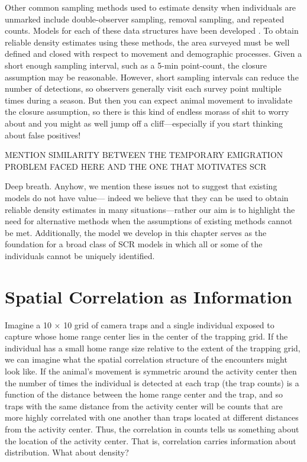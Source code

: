 Other common sampling methods used to estimate density when individuals are
unmarked include double-observer sampling, removal sampling, and
repeated counts. Models for each of these data structures have been
developed
\citep{nichols_etal:2000,farnsworth_etal:2002,royle:2004,royle:2004abc}. To
obtain reliable density estimates using these
methods, the area surveyed must be well defined and closed with
respect to movement and demographic processes. Given a short enough
sampling interval, such as a 5-min point-count, the closure
assumption may be reasonable. However, short sampling intervals can
reduce the number of detections, so observers generally visit each survey
point multiple times during a season. But then you can expect animal
movement to invalidate the closure assumption, so there is this kind
of endless morass of shit to worry about and you might as well jump
off a cliff---especially if you start thinking about false positives!

MENTION SIMILARITY BETWEEN THE TEMPORARY EMIGRATION PROBLEM FACED HERE
AND THE ONE THAT MOTIVATES SCR

Deep breath. Anyhow, we mention these issues not to suggest that
existing models do not have value---
indeed we believe that they can be used to obtain reliable density
estimates in many situations---rather our aim is to highlight the need for
alternative methods when the assumptions of existing methods cannot be
met. Additionally, the model we develop in this chapter serves as the
foundation for a broad class of SCR models in which all or some of the
individuals cannot be uniquely identified.



\section{Spatial Correlation as Information}


Imagine a 10 $\times$ 10 grid of camera traps and a single individual
exposed to capture whose home range center lies in the center of the
trapping grid. If the individual has a small home range size relative
to the extent of the trapping grid, we can imagine what the
spatial correlation structure of the encounters might look
like. If the animal's movement is symmetric around the activity center
then the number of times the individual is detected at each
trap (the trap counts) is a function of the distance between the home
range center and the trap, and so traps with the same distance from the
activity center will be counts that are more highly correlated with
one another than traps located at different distances from the
activity center. Thus, the correlation in counts tells us something
about the location of the activity center. That is, correlation
carries information about distribution. What about density?


